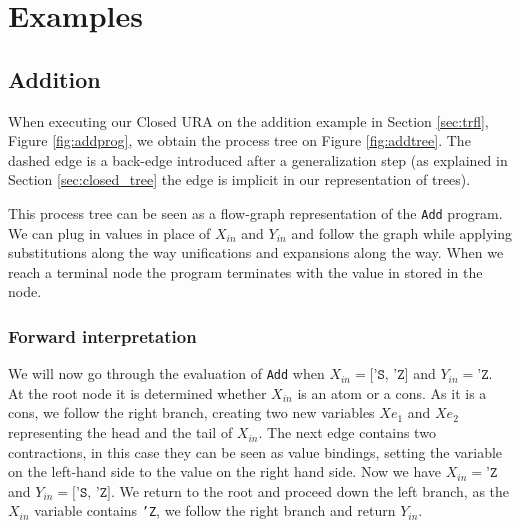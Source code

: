 \documentclass[10pt]{../sigplanconf}
\begin{document}
\section{Examples}
\subsection{Addition}
When executing our Closed URA on the addition example in Section
\ref{sec:trfl}, Figure \ref{fig:addprog}, we obtain the process tree
on Figure \ref{fig:addtree}. The dashed edge is a back-edge introduced
after a generalization step (as explained in Section
\ref{sec:closed_tree} the edge is implicit in our representation
of trees).

This process tree can be seen as a flow-graph representation of the
\texttt{Add} program. We can plug in values in place of $X_{in}$ and
$Y_{in}$ and follow the graph while applying substitutions along the
way unifications and expansions along the way. When we reach a terminal
node the program terminates with the value in stored in the node.

\subsubsection{Forward interpretation}
We will now go through the evaluation of \texttt{Add} when $X_{in} =
\texttt{['S, 'Z]}$ and $Y_{in} = \texttt{'Z}$. At the root node it is
determined whether $X_{in}$ is an atom or a cons. As it is a cons, we
follow the right branch, creating two new variables $Xe_1$ and $Xe_2$
representing the head and the tail of $X_{in}$. The next edge contains
two contractions, in this case they can be seen as value bindings,
setting the variable on the left-hand side to the value on the right
hand side. Now we have $X_{in} = \texttt{'Z}$ and $Y_{in} =
\texttt{['S, 'Z]}$. We return to the root and proceed down the left
branch, as the $X_{in}$ variable contains \texttt{'Z}, we follow the
right branch and return $Y_{in}$.
\end{document}
